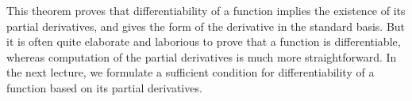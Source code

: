 \documentclass[../Analysis-3.tex]{subfiles}
\begin{document}
This theorem proves that differentiability of a function implies the existence of its partial derivatives, and gives the form of the derivative in the standard basis. But it is often quite elaborate and laborious to prove that a function is differentiable, whereas computation of the partial derivatives is much more straightforward. In the next lecture, we formulate a sufficient condition for differentiability of a function based on its partial derivatives.
\end{document}
